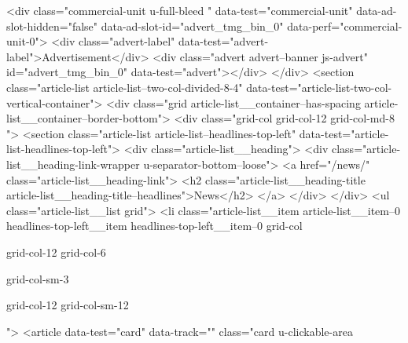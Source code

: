 {{{		
			
				
			
	
<div class="commercial-unit u-full-bleed " data-test="commercial-unit" data-ad-slot-hidden="false" data-ad-slot-id="advert_tmg_bin_0" data-perf="commercial-unit-0">
<div class="advert-label" data-test="advert-label">Advertisement</div>
<div class="advert advert--banner js-advert" id="advert_tmg_bin_0" data-test="advert"></div>
</div>
<section class="article-list article-list--two-col-divided-8-4" data-test="article-list-two-col-vertical-container">
<div class="grid article-list__container--has-spacing article-list__container--border-bottom">
<div class="grid-col grid-col-12 grid-col-md-8 ">
<section class="article-list article-list--headlines-top-left" data-test="article-list-headlines-top-left">
<div class="article-list__heading">
<div class="article-list__heading-link-wrapper
				u-separator-bottom--loose">
<a href="/news/" class="article-list__heading-link">
<h2 class="article-list__heading-title article-list__heading-title--headlines">News</h2>
</a>
</div>
</div>
<ul class="article-list__list grid">
<li class="article-list__item article-list__item--0 headlines-top-left__item headlines-top-left__item--0
			grid-col
			
			
			
			grid-col-12
			grid-col-6
			
			
			
			
			
			grid-col-sm-3
			
			
			grid-col-12 grid-col-sm-12
			
			
			
			
			
			">
<article data-test="card" data-track="" class="card
			u-clickable-area
			
			
			
			
			
			
			
}}}
